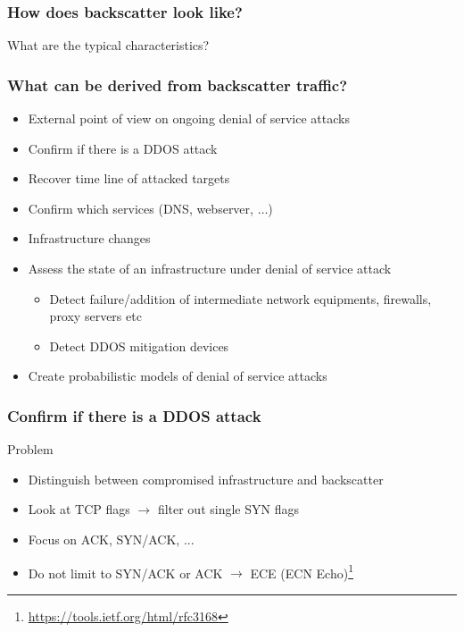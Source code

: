 \documentclass{beamer}
\begin{document}
\begin{frame}
\frametitle{How does backscatter look like?}

\begin{center}
    \alert{What are the typical characteristics?}
\end{center}
\end{frame}

\begin{frame}
\frametitle{What can be derived from backscatter traffic?}

\begin{itemize}
    \item External point of view on ongoing denial of service attacks
    \item Confirm if there is a DDOS attack
    \item Recover time line of attacked targets
    \item Confirm which services (DNS, webserver, $\dots$)
    \item Infrastructure changes
    \item Assess the state of an infrastructure under denial of service attack
    \begin{itemize}
        \item Detect failure/addition of  intermediate network equipments, firewalls, proxy servers etc
        \item Detect DDOS mitigation devices
    \end{itemize}
    \item Create probabilistic models of denial of service attacks
\end{itemize}
\end{frame}

\begin{frame}
    \frametitle{Confirm if there is a DDOS attack}
    \begin{block}{Problem}
        \begin{itemize}
            \item Distinguish between compromised infrastructure and backscatter
            \item Look at TCP flags $\to$ filter out single SYN flags
            \item Focus on ACK, SYN/ACK, ...
            \item Do not limit to SYN/ACK or ACK $\to$ ECE (ECN Echo)\footnote{\url{https://tools.ietf.org/html/rfc3168}}
        \end{itemize}
    \end{block}
    
\end{frame}
\end{document}
